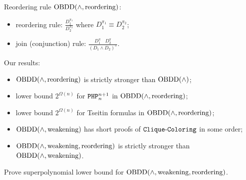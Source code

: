\begin{frame}{Reordering rule}
    $\mathrm{OBDD}(\land, \mathrm{reordering})$:
    \begin{itemize}
    	\item reordering rule: $\frac{D_1^{\pi_1}}{D_2^{\pi_2}}$ where $D_1^{\pi_1} \equiv D_2^{\pi_2}$;
        \item join (conjunction) rule: $\frac{D_1^{\pi} ~~~~ D_2^{\pi}}{(D_1 \land D_2)^{\pi}}$.
    \end{itemize}

    \pause
	Our results:
    \pause
    \begin{itemize}
        \item $\mathrm{OBDD}(\land, \mathrm{reordering})$ is strictly stronger than $\mathrm{OBDD}(\land)$;
        \pause
        \item lower bound $2^{\Omega(n)}$ for $\mathtt{PHP}^{n + 1}_n$ in $\mathrm{OBDD}(\land, \mathrm{reordering})$;
        \item lower bound $2^{\Omega(n)}$ for Tseitin formulas in $\mathrm{OBDD}(\land, \mathrm{reordering})$;
        \pause
        \item $\mathrm{OBDD}(\land, \mathrm{weakening})$ has short proofs of $\mathtt{Clique\text{-}Coloring}$ in some order;
        \item $\mathrm{OBDD}(\land, \mathrm{weakening}, \mathrm{reordering})$ is strictly stronger than $\mathrm{OBDD}(\land, \mathrm{weakening})$.
    \end{itemize}

    \pause
    \color{blue}{Open question.} Prove superpolynomial lower bound for $\mathrm{OBDD}(\land, \mathrm{weakening},
    \mathrm{reordering})$.
\end{frame}